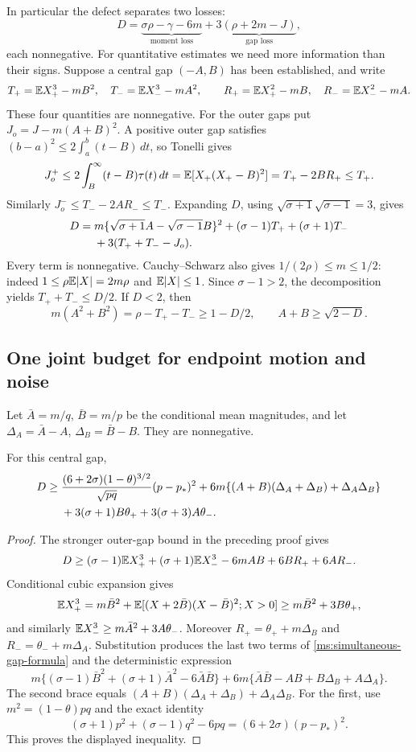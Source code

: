 In particular the defect separates two losses:
\[
 D=\underbrace{\sigma\rho-\gamma-6m}_{\text{moment loss}}
       +3\underbrace{(\rho+2m-J)}_{\text{gap loss}},
\]
each nonnegative. For quantitative estimates we need more information
than their signs. Suppose a central gap $(-A,B)$ has been established,
and write
\[
 T_+=\mathbb E X_+^3-mB^2,\quad T_-=\mathbb E X_-^3-mA^2,\qquad
 R_+=\mathbb E X_+^2-mB,\quad R_-=\mathbb E X_-^2-mA.
\]
These four quantities are nonnegative. For the outer gaps put
$J_o=J-m(A+B)^2$. A positive outer gap satisfies
$(b-a)^2\le2\int_a^b(t-B)\,dt$, so Tonelli gives
\[
 J_o^+\le2\int_B^\infty(t-B)\tau(t)\,dt
       =\mathbb E[X_+(X_+-B)^2]=T_+-2BR_+\le T_+.
\]
Similarly $J_o^-\le T_--2AR_-\le T_-$.
Expanding $D$, using $\sqrt{\sigma+1}\sqrt{\sigma-1}=3$, gives
\begin{align}
 D={}&m\{\sqrt{\sigma+1}A-\sqrt{\sigma-1}B\}^2
       +(\sigma-1)T_++(\sigma+1)T_-\notag\\
    &+3(T_++T_--J_o).\label{ms:defect-decomposition}
\end{align}
Every term is nonnegative. Cauchy--Schwarz also gives
$1/(2\rho)\le m\le1/2$: indeed $1\le\rho\mathbb E|X|=2m\rho$ and
$\mathbb E|X|\le1$. Since $\sigma-1>2$, the decomposition yields
$T_++T_-\le D/2$. If $D<2$, then
\[
 m(A^2+B^2)=\rho-T_+-T_-\ge1-D/2,
 \qquad A+B\ge\sqrt{2-D}.
\]

\subsection{One joint budget for endpoint motion and noise}

Let $\bar A=m/q$, $\bar B=m/p$ be the conditional mean magnitudes, and
let $\Delta_A=\bar A-A$, $\Delta_B=\bar B-B$. They are nonnegative.

\begin{lemma}
\label{ms:simultaneous-gap}
For this central gap,
\begin{align}
 D\ge{}&\frac{(6+2\sigma)(1-\theta)^{3/2}}{\sqrt{pq}}(p-p_*)^2
 +6m\{(A+B)(\Delta_A+\Delta_B)+\Delta_A\Delta_B\}\notag\\
 &+3(\sigma+1)B\theta_++3(\sigma+3)A\theta_-.
\label{ms:simultaneous-gap-formula}
\end{align}
\end{lemma}
\begin{proof}
The stronger outer-gap bound in the preceding proof gives
\[
 D\ge(\sigma-1)\mathbb E X_+^3+(\sigma+1)\mathbb E X_-^3
                      -6mAB+6BR_++6AR_-.
\]
Conditional cubic expansion gives
\[
 \mathbb E X_+^3=m\bar B^2+
       \mathbb E[(X+2\bar B)(X-\bar B)^2;X>0]
       \ge m\bar B^2+3B\theta_+,
\]
and similarly $\mathbb E X_-^3\ge m\bar A^2+3A\theta_-$.
Moreover $R_+=\theta_++m\Delta_B$ and
$R_-=\theta_-+m\Delta_A$. Substitution produces the last two terms of
\eqref{ms:simultaneous-gap-formula} and the deterministic expression
\[
 m\{(\sigma-1)\bar B^2+(\sigma+1)\bar A^2-6\bar A\bar B\}
 +6m\{\bar A\bar B-AB+B\Delta_B+A\Delta_A\}.
\]
The second brace equals
$(A+B)(\Delta_A+\Delta_B)+\Delta_A\Delta_B$.
For the first, use $m^2=(1-\theta)pq$ and the exact identity
\[
 (\sigma+1)p^2+(\sigma-1)q^2-6pq=(6+2\sigma)(p-p_*)^2.
\]
This proves the displayed inequality.
\end{proof}

